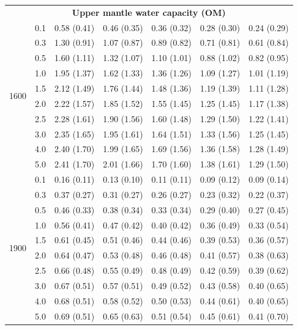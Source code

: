 \documentclass[fleqn,usenatbib]{mnras}
\begin{document}
\begin{table}
\begin{tabular}{@{} c c l l l l l @{}}
\multicolumn{7}{c}{\textbf{Upper mantle water capacity (OM)}} \\
\multirow{10}{*}{1600} & 0.1 & 0.58 (0.41) & 0.46 (0.35) & 0.36 (0.32) & 0.28 (0.30) & 0.24 (0.29) \\
 & 0.3 & 1.30 (0.91) & 1.07 (0.87) & 0.89 (0.82) & 0.71 (0.81) & 0.61 (0.84) \\
 & 0.5 & 1.60 (1.11) & 1.32 (1.07) & 1.10 (1.01) & 0.88 (1.02) & 0.82 (0.95) \\
 & 1.0 & 1.95 (1.37) & 1.62 (1.33) & 1.36 (1.26) & 1.09 (1.27) & 1.01 (1.19) \\
 & 1.5 & 2.12 (1.49) & 1.76 (1.44) & 1.48 (1.36) & 1.19 (1.39) & 1.11 (1.28) \\
 & 2.0 & 2.22 (1.57) & 1.85 (1.52) & 1.55 (1.45) & 1.25 (1.45) & 1.17 (1.38) \\
 & 2.5 & 2.28 (1.61) & 1.90 (1.56) & 1.60 (1.48) & 1.29 (1.50) & 1.22 (1.41) \\
 & 3.0 & 2.35 (1.65) & 1.95 (1.61) & 1.64 (1.51) & 1.33 (1.56) & 1.25 (1.45) \\
 & 4.0 & 2.40 (1.70) & 1.99 (1.65) & 1.69 (1.56) & 1.36 (1.58) & 1.28 (1.49) \\
 & 5.0 & 2.41 (1.70) & 2.01 (1.66) & 1.70 (1.60) & 1.38 (1.61) & 1.29 (1.50) \\
\hline
\multirow{10}{*}{1900} & 0.1 & 0.16 (0.11) & 0.13 (0.10) & 0.11 (0.11) & 0.09 (0.12) & 0.09 (0.14) \\
 & 0.3 & 0.37 (0.27) & 0.31 (0.27) & 0.26 (0.27) & 0.23 (0.32) & 0.22 (0.37) \\
 & 0.5 & 0.46 (0.33) & 0.38 (0.34) & 0.33 (0.34) & 0.29 (0.40) & 0.27 (0.45) \\
 & 1.0 & 0.56 (0.41) & 0.47 (0.42) & 0.40 (0.42) & 0.36 (0.49) & 0.33 (0.54) \\
 & 1.5 & 0.61 (0.45) & 0.51 (0.46) & 0.44 (0.46) & 0.39 (0.53) & 0.36 (0.57) \\
 & 2.0 & 0.64 (0.47) & 0.53 (0.48) & 0.46 (0.48) & 0.41 (0.57) & 0.38 (0.63) \\
 & 2.5 & 0.66 (0.48) & 0.55 (0.49) & 0.48 (0.49) & 0.42 (0.59) & 0.39 (0.62) \\
 & 3.0 & 0.67 (0.51) & 0.57 (0.51) & 0.49 (0.52) & 0.43 (0.58) & 0.40 (0.65) \\
 & 4.0 & 0.68 (0.51) & 0.58 (0.52) & 0.50 (0.53) & 0.44 (0.61) & 0.40 (0.65) \\
 & 5.0 & 0.69 (0.51) & 0.65 (0.63) & 0.51 (0.54) & 0.45 (0.61) & 0.41 (0.70) \\
\hline







\end{tabular}
\end{table}
\end{document}
